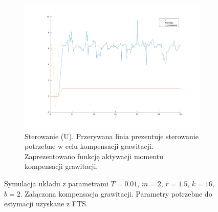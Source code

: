 \documentclass[a4paper, 10pt]{article}
\begin{document}
\begin{figure}
	\begin{subfigure}{.5\textwidth}
		\centering
		\includegraphics[width=\linewidth]{kompensacja_u}
		\caption{Sterowanie (U). Przerywana linia prezentuje sterowanie potrzebne w celu kompensacji grawitacji. Zaprezentowano funkcję aktywacji momentu kompensacji grawitacji.}
		\label{fig:kompensacja_u}
	\end{subfigure}

	\caption{Symulacja układu z parametrami $T=0.01$, $m = 2$, $r = 1.5$, $k = 16$, $b = 2$. Załączona kompensacja grawitacji. Parametry potrzebne do estymacji uzyskane z FTS.}
	\label{fig:kompensacja}
\end{figure}
\end{document}
